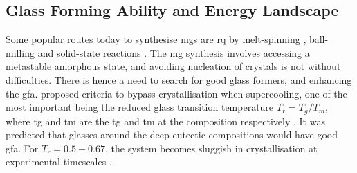 \subsection{Glass Forming Ability and Energy Landscape} \label{s:gfa}
Some popular routes today to synthesise \gls{mg}s are \gls{rq} by melt-spinning \cite{Greer1995}, ball-milling \cite{Suryanarayana2001,Weeber1988} and solid-state reactions \cite{Schwarz1983}. 
The \gls{mg} synthesis involves accessing a metastable amorphous state, and avoiding nucleation of crystals is not without difficulties. There is hence a need to search for good glass formers, and enhancing the \gls{gfa}. \textcite{Turnbull1969} proposed criteria to bypass crystallisation when supercooling, one of the most important being the reduced glass transition temperature $T_r = T_g/T_m$, where \gls{tg} and \gls{tm} are the \glsdesc{tg} and \glsdesc{tm} at the composition respectively \cite{Turnbull1969,Wang2004a}. It was predicted that glasses around the deep eutectic compositions would have good \gls{gfa}. For $T_r=0.5-0.67$, the system becomes sluggish in crystallisation at experimental timescales \cite{Turnbull1969}. \par 

